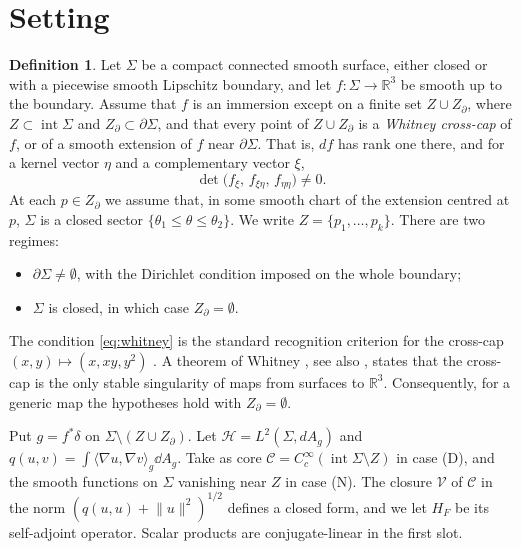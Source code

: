 \documentclass[11pt]{article}
\theoremstyle{definition}\newtheorem{definition}[theorem]{Definition}
\theoremstyle{remark}\newtheorem{remark}[theorem]{Remark}
\newcommand{\R}{\mathbb R}\newcommand{\C}{\mathbb C}\newcommand{\Z}{\mathbb Z}
\newcommand{\norm}[1]{\lVert#1\rVert}
\newcommand{\cH}{\mathcal H}\newcommand{\cV}{\mathcal V}\newcommand{\inte}{\operatorname{int}}
\begin{document}
\section{Setting}\label{sec:setting}
\begin{definition}\label{def:setting}
Let $\Sigma$ be a compact connected smooth surface, either closed or with a
piecewise smooth Lipschitz boundary, and let $f:\Sigma\to\R^3$ be smooth up to
the boundary. Assume that $f$ is an immersion except on a finite set
$Z\cup Z_\partial$, where $Z\subset\inte\Sigma$ and $Z_\partial\subset\partial\Sigma$,
and that every point of $Z\cup Z_\partial$ is a \emph{Whitney cross-cap} of $f$, or of
a smooth extension of $f$ near $\partial\Sigma$. That is, $df$ has rank one there,
and for a kernel vector $\eta$ and a complementary vector $\xi$,
\begin{equation}\label{eq:whitney}
 \det\bigl(f_\xi,\,f_{\xi\eta},\,f_{\eta\eta}\bigr)\neq0.
\end{equation}
At each $p\in Z_\partial$ we assume that, in some smooth chart of the extension
centred at $p$, $\Sigma$ is a closed sector $\{\theta_1\leq\theta\leq\theta_2\}$.
We write $Z=\{p_1,\dots,p_k\}$. There are two regimes:
\begin{itemize}
\item[(D)] $\partial\Sigma\neq\emptyset$, with the Dirichlet condition imposed
on the whole boundary;
\item[(N)] $\Sigma$ is closed, in which case $Z_\partial=\emptyset$.
\end{itemize}
\end{definition}

The condition \eqref{eq:whitney} is the standard recognition criterion for
the cross-cap $(x,y)\mapsto(x,xy,y^2)$ \cite{hasegawa}. A theorem of Whitney
\cite{whitney44}, see also \cite{gg}, states that the cross-cap is the only
stable singularity of maps from surfaces to $\R^3$. Consequently, for a
generic map the hypotheses hold with $Z_\partial=\emptyset$.

Put $g=f^*\delta$ on $\Sigma\setminus(Z\cup Z_\partial)$. Let $\cH=L^2(\Sigma,dA_g)$
and $q(u,v)=\int\langle\nabla u,\nabla v\rangle_g\dd A_g$. Take as core
$\mathcal C=C_c^\infty(\inte\Sigma\setminus Z)$ in case (D), and the smooth
functions on $\Sigma$ vanishing near $Z$ in case (N). The closure $\cV$ of
$\mathcal C$ in the norm $(q(u,u)+\norm u^2)^{1/2}$ defines a closed form, and
we let $H_F$ be its self-adjoint operator. Scalar products are
conjugate-linear in the first slot.
\end{document}
